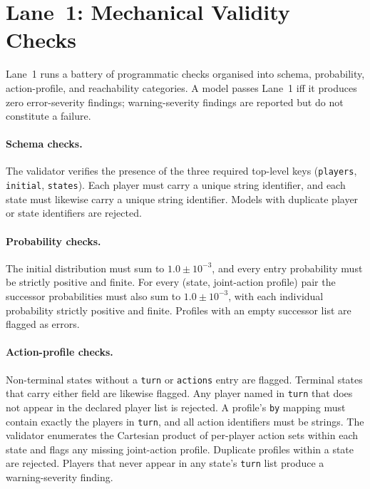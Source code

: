 \documentclass{article}
\begin{document}
\section{Lane~1: Mechanical Validity Checks}
\label{sec:lane1_details}

Lane~1 runs a battery of programmatic checks organised into schema,
probability, action-profile, and reachability categories. A model passes
Lane~1 iff it produces zero error-severity findings;
warning-severity findings are reported but do not constitute a failure.

\paragraph{Schema checks.}
The validator verifies the presence of the three required top-level keys
(\texttt{players}, \texttt{initial}, \texttt{states}). Each player must carry
a unique string identifier, and each state must likewise carry a unique string
identifier. Models with duplicate player or state identifiers are rejected.

\paragraph{Probability checks.}
The initial distribution must sum to $1.0 \pm 10^{-3}$, and every entry
probability must be strictly positive and finite. For every (state,
joint-action profile) pair the successor probabilities must also sum to
$1.0 \pm 10^{-3}$, with each individual probability strictly positive and
finite. Profiles with an empty successor list are flagged as errors.

\paragraph{Action-profile checks.}
Non-terminal states without a \texttt{turn} or \texttt{actions} entry are
flagged. Terminal states that carry either field are likewise flagged. Any
player named in \texttt{turn} that does not appear in the declared player list
is rejected. A profile's \texttt{by} mapping must contain exactly the players
in \texttt{turn}, and all action identifiers must be strings. The validator
enumerates the Cartesian product of per-player action sets within each state
and flags any missing joint-action profile. Duplicate profiles within a state
are rejected. Players that never appear in any state's \texttt{turn} list
produce a warning-severity finding.
\end{document}
